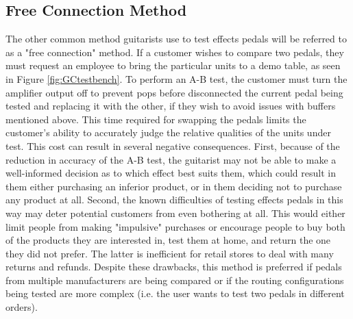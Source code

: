
\subsection{Free Connection Method}

The other common method guitarists use to test effects pedals will be referred to as a "free connection" method.  If a customer wishes to compare two pedals, they must request an employee to bring the particular units to a demo table, as seen in Figure \ref{fig:GCtestbench}.  To perform an A-B test, the customer must turn the amplifier output off to prevent pops before disconnected the current pedal being tested and replacing it with the other, if they wish to avoid issues with buffers mentioned above.  This time required for swapping the pedals limits the customer's ability to accurately judge the relative qualities of the units under test.  This cost can result in several negative consequences.  First, because of the reduction in accuracy of the A-B test, the guitarist may not be able to make a well-informed decision as to which effect best suits them, which could result in them either purchasing an inferior product, or in them deciding not to purchase any product at all.  Second, the known difficulties of testing effects pedals in this way may deter potential customers from even bothering at all.  This would either limit people from making "impulsive" purchases or encourage people to buy both of the products they are interested in, test them at home, and return the one they did not prefer.  The latter is inefficient for retail stores to deal with many returns and refunds.  Despite these drawbacks, this method is preferred if pedals from multiple manufacturers are being compared or if the routing configurations being tested are more complex (i.e. the user wants to test two pedals in different orders).

